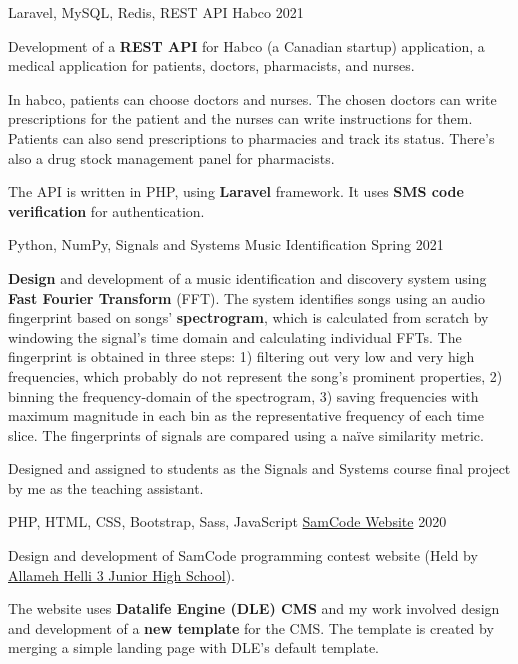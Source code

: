 \begin{cventries}
  \cventry
    {Laravel, MySQL, Redis, REST API} %
    {Habco} %
    {} %
    {2021} %
    {
      \begin{cvitems} %
      	\item {Development of a \textbf{REST API} for Habco (a Canadian startup) application, a medical application for patients, doctors, pharmacists, and nurses.}
      	\item {In habco, patients can choose doctors and nurses. The chosen doctors can write prescriptions for the patient and the nurses can write instructions for them. Patients can also send prescriptions to pharmacies and track its status. There's also a drug stock management panel for pharmacists.}
      	\item {The API is written in PHP, using \textbf{Laravel} framework. It uses \textbf{SMS code verification} for authentication.}
      \end{cvitems}
    }

  \cventry
    {Python, NumPy, Signals and Systems} %
    {Music Identification} %
    {} %
    {Spring 2021} %
    {
      \begin{cvitems} %
      	\item {\textbf{Design} and development of a music identification and discovery system using \textbf{Fast Fourier Transform} (FFT). The system identifies songs using an audio fingerprint based on songs' \textbf{spectrogram}, which is calculated from scratch by windowing the signal's time domain and calculating individual FFTs. The fingerprint is obtained in three steps: 1) filtering out very low and very high frequencies, which probably do not represent the song's prominent properties, 2) binning the frequency-domain of the spectrogram, 3) saving frequencies with maximum magnitude in each bin as the representative frequency of each time slice. The fingerprints of signals are compared using a naïve similarity metric.}
        \item {Designed and assigned to students as the Signals and Systems course final project by me as the teaching assistant.}
      \end{cvitems}
    }

  \cventry
    {PHP, HTML, CSS, Bootstrap, Sass, JavaScript} %
    {\href{https://samcode.allamehelli3.ir/}{SamCode Website}} %
    {} %
    {2020} %
    {
      \begin{cvitems} %
      	\item {Design and development of SamCode programming contest website (Held by \href{http://helli3school.ir}{Allameh Helli 3 Junior High School}).}
      	\item {The website uses \textbf{Datalife Engine (DLE) CMS} and my work involved design and development of a \textbf{new template} for the CMS. The template is created by merging a simple landing page with DLE's default template.}
      \end{cvitems}
    }


\end{cventries}
